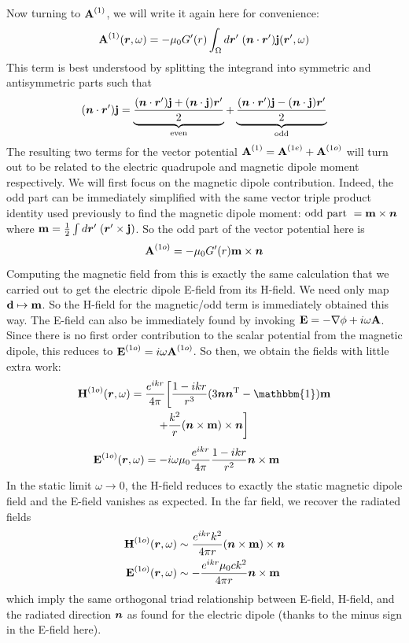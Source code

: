 \documentclass[twocolumn]{gwclass}
\newcommand{\bt}[1]{\text{\textbf{#1}}}
\begin{document}
	Now turning to $\bt{A}^{(1)}$, we will write it again here for convenience:
	$$  \bt{A}^{(1)}(\*r,\omega) = - \mu_0G'(r)\int_\Omega d\*r'\;(\*n\cdot\*r')\bt{j}(\*r',\omega) $$
	This term is best understood by splitting the integrand into symmetric and antisymmetric parts such that
	$$ (\*n\cdot\*r')\bt{j} = \underbrace{\frac{(\*n\cdot\*r')\bt{j} + (\*n\cdot\bt{j})\*r'}{2}}_{\t{even}} + \underbrace{\frac{(\*n\cdot\*r')\bt{j} - (\*n\cdot\bt{j})\*r'}{2}}_{\t{odd}} $$
	The resulting two terms for the vector potential $ \bt{A}^{(1)} = \bt{A}^{(1e)} + \bt{A}^{(1o)}$ will turn out to be related to the electric quadrupole and magnetic dipole moment respectively. We will first focus on the magnetic dipole contribution. Indeed, the odd part can be immediately simplified with the same vector triple product identity used previously to find the magnetic dipole moment: $ \t{odd part } = \bt{m}\times\*n $ where $\bt{m}=\frac{1}{2}\int d\*r'\; (\*r'\times\bt{j})$. So the odd part of the vector potential here is
	$$ \bt{A}^{(1o)} = -\mu_0 G'(r)\bt{m}\times\*n $$
	Computing the magnetic field from this is exactly the same calculation that we carried out to get the electric dipole E-field from its H-field. We need only map $\bt{d}\mapsto \bt{m}$. So the H-field for the magnetic/odd term is immediately obtained this way. 	The E-field can also be immediately found by invoking $\bt{E}=-\nabla\phi +i\omega\bt{A}$. Since there is no first order contribution to the scalar potential from the magnetic dipole, this reduces to $\bt{E}^{(1o)}=i\omega\bt{A}^{(1o)}$. So then, we obtain the fields with little extra work: 
	\begin{multline*} 
	\bt{H}^{(1o)}(\*r,\omega) = \frac{e^{ikr}}{4\pi}\bigg[\frac{1-ikr}{r^3}(3\*n\*n^\t{T} - \mathbbm{1})\bt{m}\\ + \frac{k^2}{r}(\*n\times\bt{m})\times\*n \bigg] 
\end{multline*}
	$$ \bt{E}^{(1o)}(\*r,\omega) = -i\omega \mu_0\frac{e^{ikr}}{4\pi}  \frac{1-ikr}{ r^2}\*n\times\bt{m} \qquad\:\quad$$
	In the static limit $\omega\to 0$, the H-field reduces to exactly the static magnetic dipole field and the E-field vanishes as expected. In the far field, we recover the radiated fields
	\begin{align*}
	\bt{H}^{(1o)}(\*r, \omega) &\sim \frac{e^{ikr}k^2}{4\pi r} (\*n\times\bt{m})\times\*n \\
	\bt{E}^{(1o)}(\*r,\omega) &\sim -\frac{e^{ikr}\mu_0 ck^2}{4\pi r} \*n\times\bt{m}
\end{align*}
	which imply the same orthogonal triad relationship between E-field, H-field, and the radiated direction $\boldsymbol{n}$ as found for the electric dipole (thanks to the minus sign in the E-field here).
	
\end{document}

